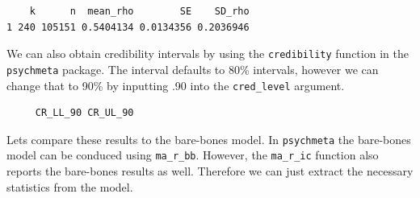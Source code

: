 \documentclass[
  letterpaper,
  DIV=11,
  numbers=noendperiod]{scrreprt}
\newenvironment{Shaded}{}{}
\newcommand{\AttributeTok}[1]{\textcolor[rgb]{0.00,0.34,0.68}{#1}}
\newcommand{\DecValTok}[1]{\textcolor[rgb]{0.69,0.50,0.00}{#1}}
\newcommand{\FunctionTok}[1]{\textcolor[rgb]{0.39,0.29,0.61}{#1}}
\newcommand{\NormalTok}[1]{\textcolor[rgb]{0.12,0.11,0.11}{#1}}
\newcommand{\SpecialCharTok}[1]{\textcolor[rgb]{0.24,0.68,0.91}{#1}}
\newcommand{\StringTok}[1]{\textcolor[rgb]{0.75,0.01,0.01}{#1}}
\begin{document}
\begin{verbatim}
    k      n  mean_rho        SE    SD_rho
1 240 105151 0.5404134 0.0134356 0.2036946
\end{verbatim}

We can also obtain credibility intervals by using the
\texttt{credibility} function in the \texttt{psychmeta} package. The
interval defaults to 80\% intervals, however we can change that to 90\%
by inputting .90 into the \texttt{cred\_level} argument.

\begin{Shaded}
\end{Shaded}

\begin{verbatim}
     CR_LL_90 CR_UL_90
\end{verbatim}

Lets compare these results to the bare-bones model. In
\texttt{psychmeta} the bare-bones model can be conduced using
\texttt{ma\_r\_bb}. However, the \texttt{ma\_r\_ic} function also
reports the bare-bones results as well. Therefore we can just extract
the necessary statistics from the model.

\begin{Shaded}
\end{Shaded}
\end{document}
